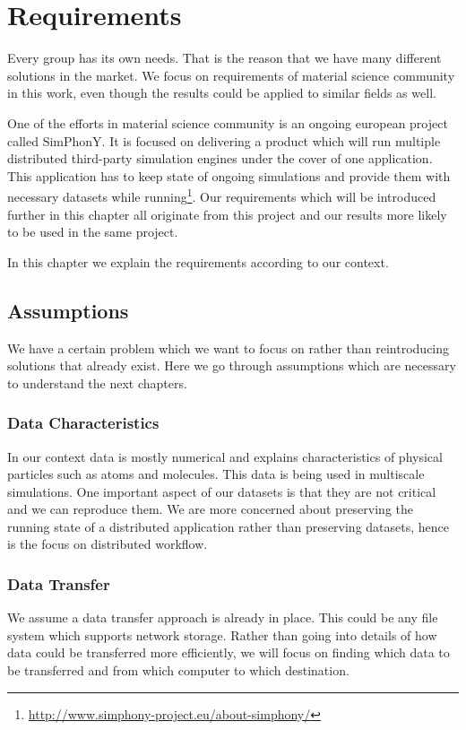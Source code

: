\chapter{Requirements}
\label{cha:requirements}

Every group has its own needs. That is the reason that we have many different solutions in the market.
We focus on requirements of material science community in this work, 
even though the results could be applied to similar fields as well. 

One of the efforts in material science community is an ongoing european project called SimPhonY.
It is focused on delivering a product which will run multiple distributed third-party simulation engines
under the cover of one application.
This application has to keep state of ongoing simulations and provide them with necessary datasets 
while running\footnote{\url{http://www.simphony-project.eu/about-simphony/}}.
Our requirements which will be introduced further in this chapter all originate from this project 
and our results more likely to be used in the same project.

In this chapter we explain the requirements according to our context.

\section{Assumptions}
We have a certain problem which we want to focus on rather than reintroducing solutions that already exist. 
Here we go through assumptions which are necessary to understand the next chapters.

\subsection{Data Characteristics}
In our context data is mostly numerical and explains characteristics of physical particles such as atoms and molecules. 
This data is being used in multiscale simulations. 
One important aspect of our datasets is that they are not critical and we can reproduce them. 
We are more concerned about preserving the running state of a distributed application rather than
preserving datasets, hence is the focus on distributed workflow.

\subsection{Data Transfer}
We assume a data transfer approach is already in place.
This could be any file system which supports 
network storage. Rather than going into details of how data could be transferred more efficiently, 
we will focus on finding which data to be transferred and from which computer to which destination.

